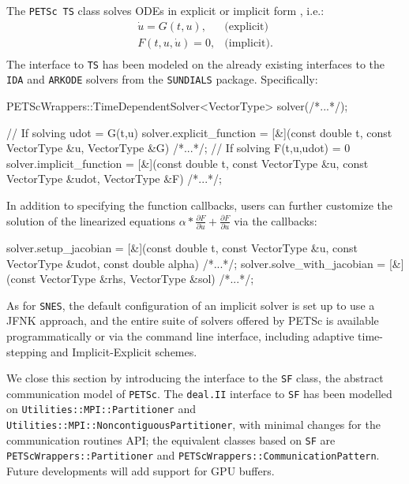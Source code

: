 \documentclass{ansarticle-preprint}
\newcommand{\specialword}[1]{\texttt{#1}}
\newcommand{\dealii}{{\specialword{deal.II}}\xspace}
\newcommand{\petsc}{\specialword{PETSc}\xspace}
\newcommand{\snes}{{\specialword{SNES}}\xspace}
\newcommand{\ts}{{\specialword{TS}}\xspace}
\newcommand{\petscsf}{{\specialword{SF}}\xspace}
\newcommand{\sundials}{{\specialword{SUNDIALS}}\xspace}
\newcommand{\ida}{{\specialword{IDA}}\xspace}
\newcommand{\arkode}{{\specialword{ARKODE}}\xspace}
\begin{document}
The \petsc~\ts class solves ODEs in explicit or implicit form \cite{abhyankar2018petsc}, i.e.:
\begin{eqnarray*}
\dot{u} = G(t,u), &\text{(explicit)}\\
F(t,u,\dot{u}) = 0, &\text{(implicit)}.\\
\end{eqnarray*}
The interface to \ts has been modeled on the already existing interfaces
to the \ida and \arkode solvers from the \sundials package. Specifically:
\begin{c++}
PETScWrappers::TimeDependentSolver<VectorType> solver(/*...*/);

// If solving udot = G(t,u)
solver.explicit_function = [&](const double     t,
                               const VectorType &u,
                               VectorType       &G) {/*...*/};
// If solving F(t,u,udot) = 0
solver.implicit_function = [&](const double     t,
                               const VectorType &u,
                               const VectorType &udot,
                               VectorType       &F) {/*...*/};
\end{c++}
In addition to specifying the function callbacks, users can further customize
the solution of the linearized equations $\alpha * \frac{\partial{F}}{\partial{\dot{u}}} + \frac{\partial{F}}{\partial{u}}$
via the callbacks:
\begin{c++}
solver.setup_jacobian = [&](const double     t,
                            const VectorType &u,
                            const VectorType &udot,
                            const double     alpha) {/*...*/};
solver.solve_with_jacobian = [&](const VectorType &rhs,
                                 VectorType       &sol) {/*...*/};
\end{c++}
As for \snes, the default configuration of an implicit solver is set up to
use a JFNK approach, and the entire suite of solvers offered by PETSc is available
programmatically or via the command line interface,
including adaptive time-stepping and Implicit-Explicit schemes.

We close this section by introducing the interface to the \petscsf class,
the abstract communication model of \petsc. The \dealii interface to
\petscsf has been modelled on \texttt{Utilities::MPI::Partitioner} and
\texttt{Utilities::MPI::NoncontiguousPartitioner}, with minimal changes for the
communication routines API; the equivalent classes based
on \petscsf are \texttt{PETScWrappers::Partitioner} and
\texttt{PETScWrappers::CommunicationPattern}.
Future developments will add support for GPU buffers.
\end{document}
